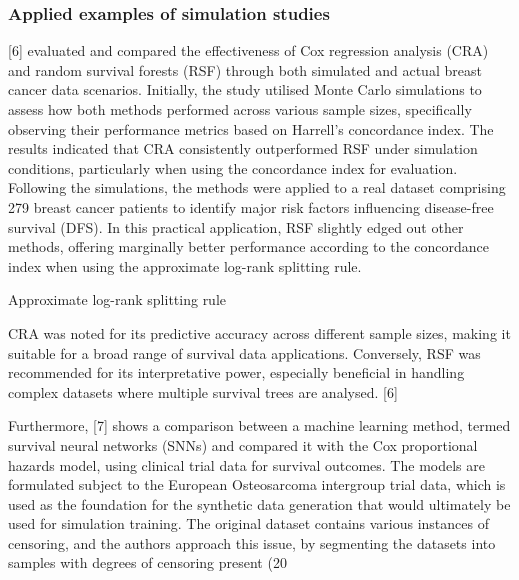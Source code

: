 \subsubsection{Applied examples of simulation studies}

[6] evaluated and compared the effectiveness of Cox regression analysis (CRA) and random survival forests (RSF) through both simulated and actual breast cancer data scenarios. Initially, the study utilised Monte Carlo simulations to assess how both methods performed across various sample sizes, specifically observing their performance metrics based on Harrell’s concordance index. The results indicated that CRA consistently outperformed RSF under simulation conditions, particularly when using the concordance index for evaluation. Following the simulations, the methods were applied to a real dataset comprising 279 breast cancer patients to identify major risk factors influencing disease-free survival (DFS). In this practical application, RSF slightly edged out other methods, offering marginally better performance according to the concordance index when using the approximate log-rank splitting rule.

Approximate log-rank splitting rule

CRA was noted for its predictive accuracy across different sample sizes, making it suitable for a broad range of survival data applications. Conversely, RSF was recommended for its interpretative power, especially beneficial in handling complex datasets where multiple survival trees are analysed. [6]

Furthermore, [7] shows a comparison between a machine learning method, termed survival neural networks (SNNs) and compared it with the Cox proportional hazards model, using clinical trial data for survival outcomes. The models are formulated subject to the European Osteosarcoma intergroup trial data, which is used as the foundation for the synthetic data generation that would ultimately be used for simulation training. The original dataset contains various instances of censoring, and the authors approach this issue, by segmenting the
datasets into samples with degrees of censoring present (20%


